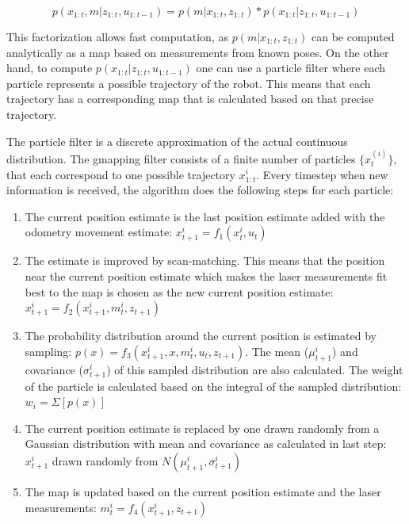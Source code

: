 \documentclass[a4paper,10pt]{article}
\begin{document}
\begin{equation*}
p(x_{1:t}, m | z_{1:t}, u_{1:t-1}) = p(m | x_{1:t}, z_{1:t})*p(x_{1:t} | z_{1:t}, u_{1:t-1})
\end{equation*}

This factorization allows fast computation, as $p(m | x_{1:t}, z_{1:t})$ can be computed analytically as a map based on measurements from known poses. On the other hand, to compute $p(x_{1:t} | z_{1:t}, u_{1:t-1})$ one can use a particle filter where each particle represents a possible trajectory of the robot. This means that each trajectory has a corresponding map that is calculated based on that precise trajectory.

The particle filter is a discrete approximation of the actual continuous distribution. The gmapping filter consists of a finite number of particles $\{ x_t^{(i)} \} $, that each correspond to one possible trajectory $x_{1:t}^i$. Every timestep when new information is received, the algorithm does the following steps for each particle:

\begin{enumerate}
\item The current position estimate is the last position estimate added with the odometry movement estimate: $x_{t+1}^i=f_1(x_t^i, u_t)$

\item The estimate is improved by scan-matching. This means that the position near the current position estimate which makes the laser measurements fit best to the map is chosen as the new current position estimate: $x_{t+1}^i=f_2(x_{t+1}^i, m_t^i, z_{t+1})$

\item The probability distribution around the current position is estimated by sampling: $p(x)=f_3(x_{t+1}^i, x, m_t^i, u_t, z_{t+1})$. The mean ($\mu_{t+1}^i$) and covariance ($\sigma_{t+1}^i$) of this sampled distribution are also calculated. The weight of the particle is calculated based on the integral of the sampled distribution: $w_i=\Sigma[p(x)]$

\item The current position estimate is replaced by one drawn randomly from a Gaussian distribution with mean and covariance as calculated in last step: $x_{t+1}^i$  drawn randomly from  $N(\mu_{t+1}^i, \sigma_{t+1}^i)$

\item The map is updated based on the current position estimate and the laser measurements: $m_t^i=f_4(x_{t+1}^i, z_{t+1})$
\end{enumerate}
\end{document}
